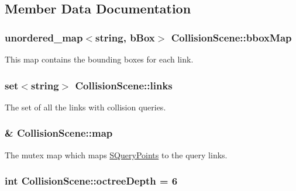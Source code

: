 \subsection{Member Data Documentation}
\hypertarget{classCollisionScene_a86929e1d07a315dec9e6c1b305cacabc}{
\subsubsection[{bbox\-Map}]{\setlength{\rightskip}{0pt plus 5cm}unordered\-\_\-map$<$string, {\bf b\-Box}$>$ Collision\-Scene\-::bbox\-Map\hspace{0.3cm}{\ttfamily [private]}}}\label{classCollisionScene_a86929e1d07a315dec9e6c1b305cacabc}
This map contains the bounding boxes for each link. \hypertarget{classCollisionScene_ab6fe95cec3f4207074aabedce8b4be61}{
\subsubsection[{links}]{\setlength{\rightskip}{0pt plus 5cm}set$<$string$>$ Collision\-Scene\-::links\hspace{0.3cm}{\ttfamily [private]}}}\label{classCollisionScene_ab6fe95cec3f4207074aabedce8b4be61}
The set of all the links with collision queries. \hypertarget{classCollisionScene_a50300cec4b2a8bb3c3d51eef54acc0f8}{
\subsubsection[{map}]{\& Collision\-Scene\-::map\hspace{0.3cm}{\ttfamily [private]}}}\label{classCollisionScene_a50300cec4b2a8bb3c3d51eef54acc0f8}
The mutex map which maps \hyperlink{structCollisionScene_1_1SQueryPoints}{S\-Query\-Points} to the query links. \hypertarget{classCollisionScene_a7b106dc5a0338af700abaf62d6d77ad9}{
\subsubsection[{octree\-Depth}]{\setlength{\rightskip}{0pt plus 5cm}int Collision\-Scene\-::octree\-Depth = 6\hspace{0.3cm}{\ttfamily [private]}}}\label{classCollisionScene_a7b106dc5a0338af700abaf62d6d77ad9}
